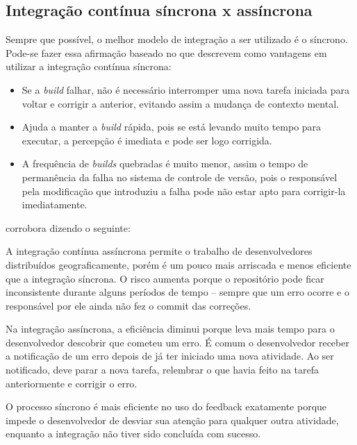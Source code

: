 \subsection{Integração contínua síncrona x assíncrona} %
\label{sub:sincrona_x_assincrona}

Sempre que possível, o melhor modelo de integração a ser utilizado é o síncrono. Pode-se fazer essa afirmação baseado no que  descrevem como vantagens em utilizar a integração contínua síncrona:

\begin{itemize}
  \item Se a \textit{build} falhar, não é necessário interromper uma nova tarefa iniciada para voltar e corrigir a anterior, evitando assim a mudança de contexto mental.
  \item Ajuda a manter a \textit{build} rápida, pois se está levando muito tempo para executar, a percepção é imediata e pode ser logo corrigida.
  \item A frequência de \textit{builds} quebradas é muito menor, assim o tempo de permanência da falha no sistema de controle de versão, pois o responsável pela modificação que introduziu a falha pode não estar apto para corrigir-la imediatamente.
\end{itemize}

 corrobora dizendo o seguinte:

\begin{citacao}
A integração contínua assíncrona permite o trabalho de desenvolvedores distribuídos geograficamente, porém é um pouco mais arriscada e menos eficiente que a integração síncrona. O risco aumenta porque o repositório pode ficar inconsistente durante alguns períodos de tempo – sempre que um erro ocorre e o responsável por ele ainda não fez o commit das correções.

Na integração assíncrona, a eficiência diminui porque leva mais tempo para o desenvolvedor descobrir que cometeu um erro. É comum o desenvolvedor receber a notificação de um erro depois de já ter iniciado uma nova atividade. Ao ser notificado, deve parar a nova tarefa, relembrar o que havia feito na tarefa anteriormente e corrigir o erro.

O processo síncrono é mais eficiente no uso do feedback exatamente porque impede o desenvolvedor de desviar sua atenção para qualquer outra atividade, enquanto a integração não tiver sido concluída com sucesso.
\end{citacao}

